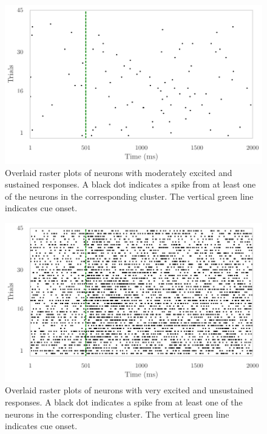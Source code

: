 \documentclass{article}
\begin{document}
\begin{figure}[H]
\begin{center}
\includegraphics[scale=1]{img/cue_5.pdf}
\end{center}
\caption{Overlaid raster plots of neurons with moderately excited and sustained responses. A black dot indicates a spike from at least one of the neurons in the corresponding cluster. The vertical green line indicates cue onset.}\label{cue5-raster}
\end{figure}

\begin{figure}[H]
\begin{center}
\includegraphics[scale=1]{img/cue_6.pdf}
\end{center}
\caption{Overlaid raster plots of neurons with very excited and unsustained responses. A black dot indicates a spike from at least one of the neurons in the corresponding cluster. The vertical green line indicates cue onset.}\label{cue6-raster}
\end{figure}
\end{document}
